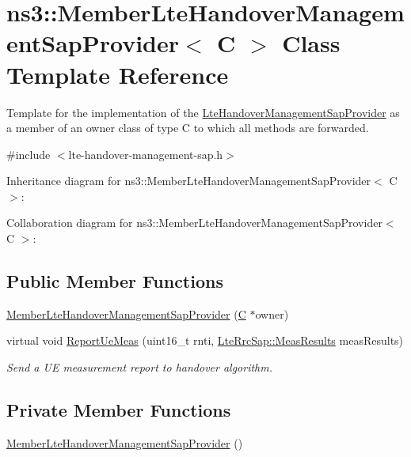 \hypertarget{classns3_1_1MemberLteHandoverManagementSapProvider}{}\section{ns3\+:\+:Member\+Lte\+Handover\+Management\+Sap\+Provider$<$ C $>$ Class Template Reference}
\label{classns3_1_1MemberLteHandoverManagementSapProvider}


Template for the implementation of the \hyperlink{classns3_1_1LteHandoverManagementSapProvider}{Lte\+Handover\+Management\+Sap\+Provider} as a member of an owner class of type C to which all methods are forwarded.  




{\ttfamily \#include $<$lte-\/handover-\/management-\/sap.\+h$>$}



Inheritance diagram for ns3\+:\+:Member\+Lte\+Handover\+Management\+Sap\+Provider$<$ C $>$\+:


Collaboration diagram for ns3\+:\+:Member\+Lte\+Handover\+Management\+Sap\+Provider$<$ C $>$\+:
\subsection*{Public Member Functions}
\begin{DoxyCompactItemize}
\item 
\hyperlink{classns3_1_1MemberLteHandoverManagementSapProvider_a0105bdc0c811d7061a13ae628f423bf3}{Member\+Lte\+Handover\+Management\+Sap\+Provider} (\hyperlink{loss__COST231__small__cities__urban_8m_aaa53ca0b650dfd85c4f59fa156f7a2cc}{C} $\ast$owner)
\item 
virtual void \hyperlink{classns3_1_1MemberLteHandoverManagementSapProvider_a3db503c2725f690e15bc67d831afe01e}{Report\+Ue\+Meas} (uint16\+\_\+t rnti, \hyperlink{structns3_1_1LteRrcSap_1_1MeasResults}{Lte\+Rrc\+Sap\+::\+Meas\+Results} meas\+Results)
\begin{DoxyCompactList}\small\item\em Send a UE measurement report to handover algorithm. \end{DoxyCompactList}\end{DoxyCompactItemize}
\subsection*{Private Member Functions}
\begin{DoxyCompactItemize}
\item 
\hyperlink{classns3_1_1MemberLteHandoverManagementSapProvider_a9758c3809c6bc50d159016d471af916e}{Member\+Lte\+Handover\+Management\+Sap\+Provider} ()
\end{DoxyCompactItemize}
